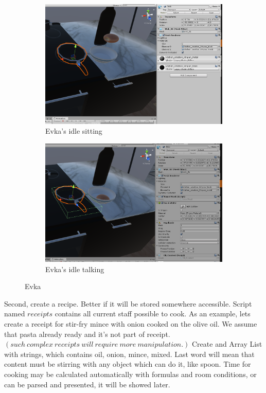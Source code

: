 \documentclass[18pt]{article}
\numberwithin{equation}{section} %
\numberwithin{figure}{section} %
\numberwithin{table}{section} %
\begin{document}
		\begin{figure}[H]
			\centering
			\begin{subfigure}{0.45\textwidth}
				\centering
				\includegraphics[width=1\linewidth]{images/franpan}
				\caption{Evka's idle sitting}
			\end{subfigure}
			\begin{subfigure}{0.45\textwidth}
				\centering
				\includegraphics[width=1\linewidth]{images/franpan_script}
				\caption{Evka's idle talking}
			\end{subfigure}		
			\caption{Evka}
			\label{fig:add_franpan}
		\end{figure}
		
		Second, create a recipe. Better if it will be stored somewhere accessible. Script named $receipts$ contains all current staff possible to cook. As an example, lets create a receipt for stir-fry mince with onion cooked on the olive oil. We assume that pasta already ready and it's not part of receipt. $ \left(such\ complex\ receipts\ will\ require\ more\ manipulation.  \right) $ Create and Array List with strings, which contains oil, onion, mince, mixed. Last word will mean that content must be stirring with any object which can do it, like spoon. Time for cooking may be calculated automatically with formulas and room conditions, or can be parsed and presented, it will be showed later. \\
		
\end{document}
